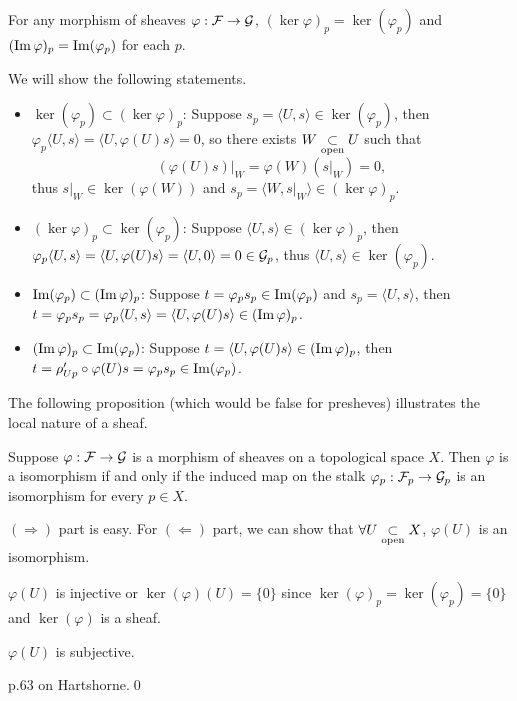 \documentclass[10pt]{extbook}
\begin{document}
\pro  \label{pro:5} For any morphism of sheaves $\varphi:\mathcal{F}\to\mathcal{G}$, 
$(\ker \varphi)_p=\ker(\varphi_p)$ and $(\operatorname{Im} \varphi)_p=\operatorname{Im}(\varphi_p)$ for each $p$.

\proof We will show the following statements.
	\begin{itemize}
		\item $\ker(\varphi_p)\subset (\ker \varphi)_p$: Suppose 
			$s_p=\langle U,s\rangle\in \ker(\varphi_p)$, then 
			$\varphi_p\langle U,s\rangle=\langle U,\varphi(U)s\rangle=0$, so there 
			exists $W\underset{\mathrm{open}}{\subset} U$ such that 
		\[
			(\varphi(U)s)|_W=\varphi(W)(s|_W)=0,
		\]
		thus $s|_W\in \ker(\varphi(W))$ and $s_p=\langle W,s|_W\rangle\in (\ker \varphi)_p$.

		\item $(\ker \varphi)_p\subset\ker(\varphi_p)$: Suppose $\langle U,s\rangle\in (\ker \varphi)_p$, then $\varphi_p\langle U,s\rangle=\langle U,\varphi(U)s\rangle=\langle U,0\rangle=0\in \mathcal{G}_p$, thus $\langle U,s\rangle\in \ker(\varphi_p)$.

		\item $\operatorname{Im}(\varphi_p)\subset (\operatorname{Im} \varphi)_p$: Suppose $t=\varphi_ps_p\in\operatorname{Im} (\varphi_p)$ and $s_p=\langle U,s\rangle$, then $t=\varphi_ps_p=\varphi_p\langle U,s\rangle=\langle U,\varphi(U)s\rangle\in (\operatorname{Im} \varphi)_p$.

		\item $(\operatorname{Im} \varphi)_p\subset \operatorname{Im}(\varphi_p)$: Suppose $t=\langle U,\varphi(U)s\rangle\in (\operatorname{Im} \varphi)_p$, then $t=\rho'_{Up}\circ\varphi(U)s=\varphi_p s_p \in \operatorname{Im}(\varphi_p)$.
	\end{itemize}

The following proposition (which would be false for presheves) illustrates the local
nature of a sheaf.

\pro \label{pro:1}Suppose $\varphi:\mathcal{F}\to\mathcal{G}$ is a morphism of sheaves on a 
topological space $X$. Then $\varphi$ is a isomorphism if and only if the induced map 
on the stalk $\varphi_p:\mathcal{F}_p\to \mathcal{G}_p$ is an isomorphism for every $p\in X$.

\proof $(\Rightarrow)$ part is easy. For $(\Leftarrow)$ part, we can show that 
$\forall U\underset{\mathrm{open}}{\subset} X$, $\varphi(U)$ is an isomorphism.

$\varphi(U)$ is injective or $\ker(\varphi)(U)=\{0\}$ since 
$\ker(\varphi)_p=\ker(\varphi_p)=\{0\}$ and $\ker(\varphi)$ is a sheaf.

$\varphi(U)$ is subjective.

p.63 on Hartshorne.\qed
\end{document}
